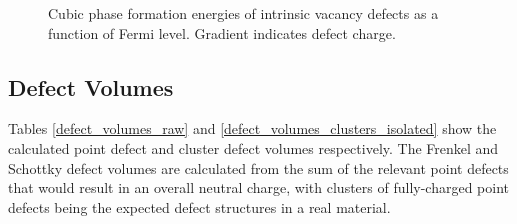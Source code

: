 \begin{figure}[ht]
\begin{center}
		\caption{Cubic phase formation energies of intrinsic vacancy defects as a function of Fermi level. Gradient indicates defect charge.}
		\label{figure:cubicvacancies}
	\end{center}
\end{figure}

\subsection{Defect Volumes}

Tables \ref{defect_volumes_raw} and \ref{defect_volumes_clusters_isolated} show the calculated point defect and cluster defect volumes respectively. The Frenkel and Schottky defect volumes are calculated from the sum of the relevant point defects that would result in an overall neutral charge, with clusters of fully-charged point defects being the expected defect structures in a real material.

